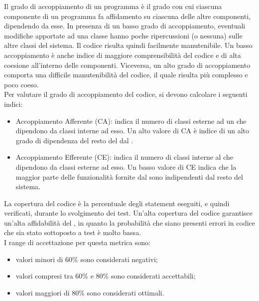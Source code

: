 		Il grado di accoppiamento di un programma è il grado con cui ciascuna componente di un programma fa affidamento su ciascuna delle altre componenti, dipendendo da esse. In presenza di un basso grado di accoppiamento, eventuali modifiche apportate ad una classe hanno poche ripercussioni (o nessuna) sulle altre classi del sistema. Il codice risulta quindi facilmente manutenibile. Un basso accoppiamento è anche indice di maggiore comprensibilità del codice e di alta coesione all'interno delle componenti. Viceversa, un alto grado di accoppiamento comporta una difficile manutenibilità del codice, il quale risulta più complesso e poco coeso.\\
		Per valutare il grado di accoppiamento del codice, si devono calcolare i seguenti indici:
		\begin{itemize}
			\item Accoppiamento Afferente (CA): indica il numero di classi esterne ad un  che dipendono da classi interne ad esso. Un alto valore di CA è indice di un alto grado di dipendenza del resto del  dal .
			\item Accoppiamento Efferente (CE): indica il numero di classi interne al  che dipendono da classi esterne ad esso. Un basso valore di CE indica che la maggior parte delle funzionalità fornite dal  sono indipendenti dal resto del sistema.
		\end{itemize}
		La copertura del codice è la percentuale degli statement eseguiti, e quindi verificati, durante lo svolgimento dei test. Un'alta copertura del codice garantisce un'alta affidabilità del , in quanto la probabilità che siano presenti errori in codice che sia stato sottoposto a test è molto bassa.\\
		I range di accettazione per questa metrica sono:
		\begin{itemize}
			\item valori minori di 60\% sono considerati negativi;
			\item valori compresi tra 60\% e 80\% sono considerati accettabili;
			\item valori maggiori di 80\% sono considerati ottimali.
		\end{itemize}
		
